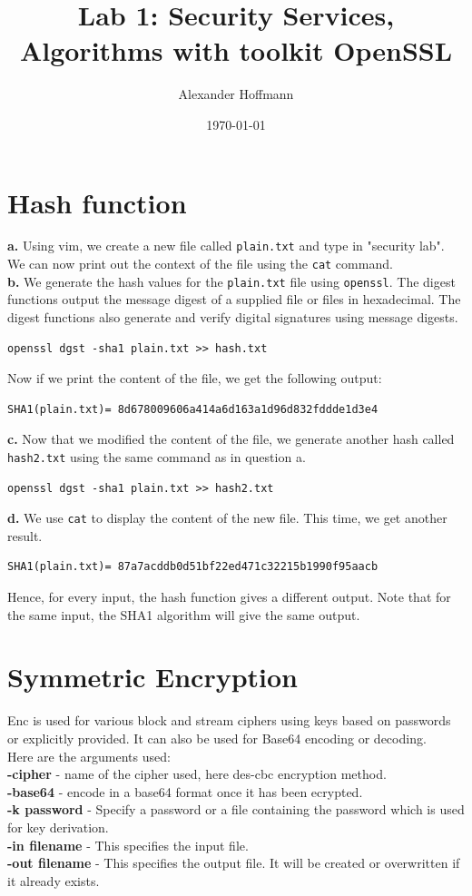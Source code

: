 \documentclass[12pt]{extarticle}
\title{Lab 1: Security Services, Algorithms with toolkit OpenSSL}
\author{Alexander Hoffmann}
\date{\today}
\begin{document}
\maketitle

\section{Hash function}
\textbf{a.} Using vim, we create a new file called \texttt{plain.txt} and type in "security lab". We can now print out the context of the file using the \texttt{cat} command.\\

\textbf{b.} We generate the hash values for the \texttt{plain.txt} file using \texttt{openssl}. The digest functions output the message digest of a supplied file or files in hexadecimal. The digest functions also generate and verify digital signatures using message digests.
\begin{verbatim}
openssl dgst -sha1 plain.txt >> hash.txt
\end{verbatim}
Now if we print the content of the file, we get the following output:
\begin{verbatim}
SHA1(plain.txt)= 8d678009606a414a6d163a1d96d832fddde1d3e4
\end{verbatim}

\textbf{c.} Now that we modified the content of the file, we generate another hash called \texttt{hash2.txt} using the same command as in question a.
\begin{verbatim}
openssl dgst -sha1 plain.txt >> hash2.txt
\end{verbatim}

\textbf{d.} We use \texttt{cat} to display the content of the new file. This time, we get another result.
\begin{verbatim}
SHA1(plain.txt)= 87a7acddb0d51bf22ed471c32215b1990f95aacb
\end{verbatim}
Hence, for every input, the hash function gives a different output. Note that for the same input, the SHA1 algorithm will give the same output.

\section{Symmetric Encryption}
Enc is used for various block and stream ciphers using keys based on passwords or explicitly provided. It can also be used for Base64 encoding or decoding.\\

Here are the arguments used:\\
\textbf{-cipher} - name of the cipher used, here des-cbc encryption method.\\
\textbf{-base64} - encode in a base64 format once it has been ecrypted.\\
\textbf{-k password} - Specify a password or a file containing the password which is used for key derivation.\\
\textbf{-in filename} - This specifies the input file.\\
\textbf{-out filename} - This specifies the output file. It will be created or overwritten if it already exists.\\
\end{document}
